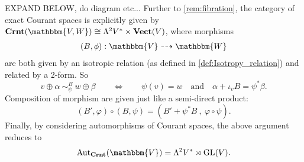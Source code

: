 EXPAND BELOW, do diagram etc...
Further to \cref{rem:fibration}, the category of exact Courant spaces is explicitly given by $\mathbf{Crnt}(\mathbbm{V,W}) \cong \Lambda^2 V^* \times \mathbf{Vect}(V)$, where morphisms
\begin{align*}
    (B, \phi) : \mathbbm{V} \dashrightarrow \mathbbm{W}
\end{align*}
are both given by an isotropic relation (as defined in \cref{def:Isotropy_relation}) and related by a 2-form.
So
\begin{equation}
    v \oplus \alpha\:  \sim_\psi^B \: w \oplus \beta \qquad \Leftrightarrow \qquad
    \psi(v) = w \quad \mathrm{ and } \quad \alpha + \iota_v B = \psi^* \beta.
\end{equation}
Composition of morphism are given just like a semi-direct product:
\begin{equation}
    (B', \varphi) \circ (B, \psi) = (B' + \psi^* B \:,\: \varphi \circ \psi).
\end{equation}
Finally, by considering automorphisms of Courant spaces, the above argument reduces to
\begin{equation}
    \mathrm{Aut}_{\mathbf{Crnt}}(\mathbbm{V}) = \Lambda^2 V^* \rtimes \mathrm{GL}(V).
\end{equation}
